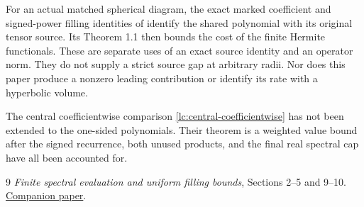\documentclass[11pt]{article}
\numberwithin{equation}{section}
\theoremstyle{remark}\newtheorem{remark}[theorem]{Remark}
\begin{document}
For an actual matched spherical diagram, the exact marked coefficient
and signed-power filling identities of
\cite[Theorem 9.1 and Corollary 9.2]{FinitePaper} identify the shared
polynomial with its original tensor source. Its Theorem 1.1 then
bounds the cost of the finite Hermite functionals. These are separate
uses of an exact source identity and an operator norm.
They do not supply a strict source gap at arbitrary radii.
Nor does this paper produce a nonzero leading contribution or
identify its rate with a hyperbolic volume.

The central coefficientwise comparison
\eqref{lc:central-coefficientwise} has not been extended to the
one-sided polynomials. Their theorem is a weighted value bound after
the signed recurrence, both unused products, and the final real
spectral cap have all been accounted for.

\begin{thebibliography}{9}
\emph{Finite spectral evaluation and uniform filling bounds},
Sections 2--5 and 9--10.
\href{https://sashakolpakov.github.io/murakamis_dream/papers/filling-bounds.pdf}
{Companion paper}.
\end{thebibliography}
\end{document}
